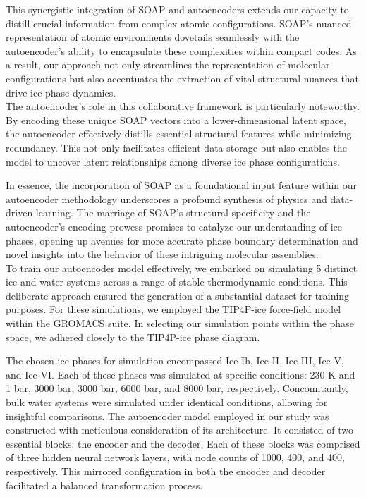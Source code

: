 This synergistic integration of SOAP and autoencoders extends our capacity to distill crucial information from complex atomic configurations. SOAP's nuanced representation of atomic environments dovetails seamlessly with the autoencoder's ability to encapsulate these complexities within compact codes. As a result, our approach not only streamlines the representation of molecular configurations but also accentuates the extraction of vital structural nuances that drive ice phase dynamics.\\

The autoencoder's role in this collaborative framework is particularly noteworthy. By encoding these unique SOAP vectors into a lower-dimensional latent space, the autoencoder effectively distills essential structural features while minimizing redundancy. This not only facilitates efficient data storage but also enables the model to uncover latent relationships among diverse ice phase configurations.

In essence, the incorporation of SOAP as a foundational input feature within our autoencoder methodology underscores a profound synthesis of physics and data-driven learning. The marriage of SOAP's structural specificity and the autoencoder's encoding prowess promises to catalyze our understanding of ice phases, opening up avenues for more accurate phase boundary determination and novel insights into the behavior of these intriguing molecular assemblies.\\
To train our autoencoder model effectively, we embarked on simulating 5 distinct ice and water systems across a range of stable thermodynamic conditions. This deliberate approach ensured the generation of a substantial dataset for training purposes. For these simulations, we employed the TIP4P-ice force-field model within the GROMACS suite\cite{gmx1}\cite{Abraham2015}\cite{Berendsen1995}. In selecting our simulation points within the phase space, we adhered closely to the TIP4P-ice phase diagram\cite{Bore2022}.

The chosen ice phases for simulation encompassed Ice-Ih, Ice-II, Ice-III, Ice-V, and Ice-VI. Each of these phases was simulated at specific conditions: 230 K and 1 bar, 3000 bar, 3000 bar, 6000 bar, and 8000 bar, respectively. Concomitantly, bulk water systems were simulated under identical conditions, allowing for insightful comparisons.
The autoencoder model employed in our study was constructed with meticulous consideration of its architecture. It consisted of two essential blocks: the encoder and the decoder. Each of these blocks was comprised of three hidden neural network layers, with node counts of 1000, 400, and 400, respectively. This mirrored configuration in both the encoder and decoder facilitated a balanced transformation process.

